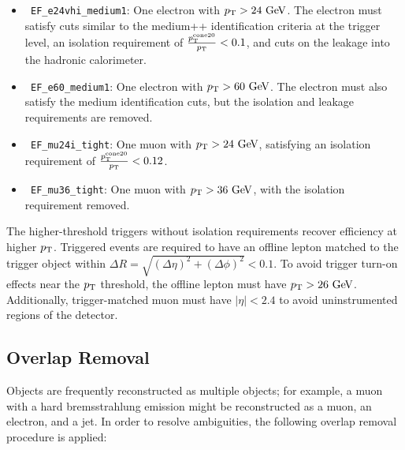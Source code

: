 \begin{itemize}
	\item \texttt{ EF\_e24vhi\_medium1}: One electron with $\pt>24 \GeV$. The electron must satisfy cuts similar to the medium++ identification criteria at the trigger level, an isolation requirement of $\frac{p_{\text{T}}^{\mathrm{cone}20}}{p_{\text{T}}}<0.1$, and cuts on the leakage into the hadronic calorimeter.
	\item \texttt{ EF\_e60\_medium1}: One electron with $\pt>60 \GeV$. The electron must also satisfy the medium identification cuts, but the isolation and leakage requirements are removed.
	\item \texttt{ EF\_mu24i\_tight}: One muon with $\pt>24 \GeV$, satisfying an isolation requirement of $\frac{p_{\text{T}}^{\mathrm{cone}20}}{p_{\text{T}}}<0.12$.
	\item \texttt{ EF\_mu36\_tight}: One muon with $\pt>36 \GeV$, with the isolation requirement removed.
\end{itemize}

The higher-threshold triggers without isolation requirements recover efficiency at higher $p_{\text{T}}$. Triggered events are required to have an offline lepton matched to the trigger object within $\Delta R=\sqrt{(\Delta\eta)^2+(\Delta\phi)^2} < 0.1$. To avoid trigger turn-on effects near the $p_{\text{T}}$ threshold, the offline lepton must have $\pt>26 \GeV$. Additionally, trigger-matched muon must have $|\eta|<2.4$ to avoid uninstrumented regions of the detector.


\subsection{Overlap Removal}\label{sec:model-independent-overlap-removal}
Objects are frequently reconstructed as multiple objects; for example, a muon with a hard bremsstrahlung emission might be reconstructed as a muon, an electron, and a jet. In order to resolve ambiguities, the following overlap removal procedure is applied:

